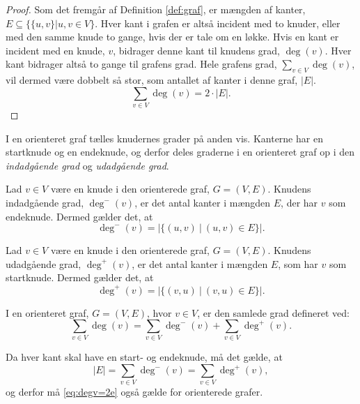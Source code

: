 \begin{proof}
Som det fremgår af Definition \ref{def:graf}, er mængden af kanter, $E \subseteq \{\{u,v\}|u,v \in V \}$. Hver kant i grafen er altså incident med to knuder, eller med den samme knude to gange, hvis der er tale om en løkke. Hvis en kant er incident med en knude, $v$, bidrager denne kant til knudens grad, $\deg(v)$. Hver kant bidrager altså to gange til grafens grad. Hele grafens grad, $\sum_{v \in V} { } \deg(v)$, vil dermed være dobbelt så stor, som antallet af kanter i denne graf, $|E|$. 
\begin{equation}
\sum_{v \in V} { } \deg(v) = 2 \cdot |E|.
\end{equation} 
\end{proof}

I en orienteret graf tælles knudernes grader på anden vis. Kanterne har en startknude og en endeknude, og derfor deles graderne i en orienteret graf op i den \emph{indadgående grad} og \emph{udadgående grad}. 

\begin{defn}
Lad $v \in V$ være en knude i den orienterede graf, $G = (V,E)$. Knudens indadgående grad, $\deg^-(v)$, er det antal kanter i mængden $E$, der har $v$ som endeknude. Dermed gælder det, at
\begin{equation}
\deg^-(v)=|\{(u,v) \ | \ (u,v) \in E \}|.
\end{equation}
\end{defn}

\begin{defn}
Lad $v \in V$ være en knude i den orienterede graf, $G = (V,E)$. Knudens udadgående grad, $\deg^+(v)$, er det antal kanter i mængden $E$, som har $v$ som startknude. Dermed gælder det, at
\begin{equation}
\deg^+(v)=|\{(v,u) \ | \ (v,u) \in E \}|.
\end{equation}
\end{defn}

\begin{defn}
I en orienteret graf, $G = (V,E)$, hvor $v \in V$, er den samlede grad defineret ved: 
\begin{equation}
\sum_{v \in V} { } \deg(v) = \sum_{v \in V} { } \deg^{-}(v) + \sum_{v \in V} { } \deg^{+}(v).
\end{equation}
\end{defn}

Da hver kant skal have en start- og endeknude, må det gælde, at 
\begin{equation}
|E|= \sum_{v \in V} { } \deg^{-}(v) = \sum_{v \in V} { } \deg^{+}(v),
\end{equation}
og derfor må \autoref{eq:degv=2e} også gælde for orienterede grafer.

